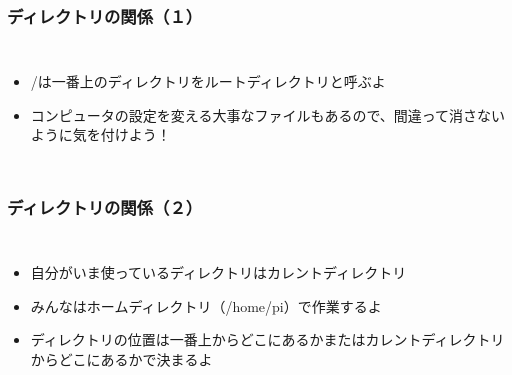 \begin{frame}
    \frametitle{ディレクトリの関係（１）}
    \begin{columns}
            \centering
            
            \begin{itemize}
                \item /は一番上のディレクトリをルートディレクトリと呼ぶよ
                \item コンピュータの設定を変える大事なファイルもあるので、間違って消さないように気を付けよう！
            \end{itemize}
    \end{columns}
\end{frame}

\begin{frame}
    \frametitle{ディレクトリの関係（２）}
    \begin{columns}
            \centering
            
            \begin{itemize}
                \item 自分がいま使っているディレクトリはカレントディレクトリ
                \item みんなはホームディレクトリ（/home/pi）で作業するよ
                \item ディレクトリの位置は一番上からどこにあるかまたはカレントディレクトリからどこにあるかで決まるよ
            \end{itemize}
    \end{columns}
\end{frame}

